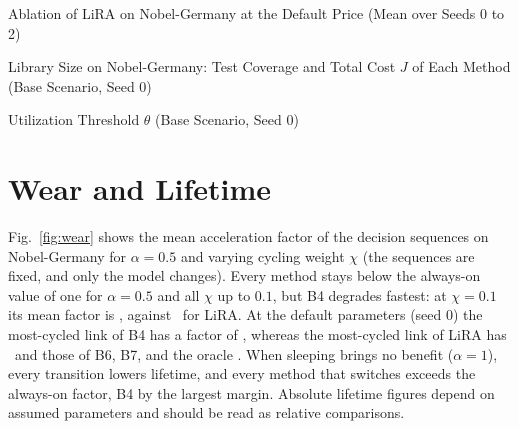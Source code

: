 \documentclass[preprint,12pt]{elsarticle}
\begin{document}
\begin{table}[h!]
\centering
\caption{Ablation of LiRA on Nobel-Germany at the Default Price (Mean over Seeds 0 to 2)}
\label{tab:ablation}
\scriptsize
\setlength{\tabcolsep}{2pt}
\begin{adjustbox}{max width=\linewidth}\end{adjustbox}
\end{table}


\begin{table}[h!]
\centering
\caption{Library Size on Nobel-Germany: Test Coverage and Total Cost $J$ of Each Method (Base Scenario, Seed 0)}
\label{tab:K}
\footnotesize
\setlength{\tabcolsep}{4pt}
\begin{adjustbox}{max width=\linewidth}\end{adjustbox}
\end{table}


\begin{table}[h!]
\centering
\caption{Utilization Threshold $\theta$ (Base Scenario, Seed 0)}
\label{tab:theta}
\footnotesize
\setlength{\tabcolsep}{4pt}
\begin{adjustbox}{max width=\linewidth}\end{adjustbox}
\end{table}


\section{Wear and Lifetime}\label{sec:res-wear}

Fig.~\ref{fig:wear} shows the mean acceleration factor of the decision sequences on Nobel-Germany for $\alpha=0.5$ and varying cycling weight $\chi$ (the sequences are fixed, and only the model changes). Every method stays below the always-on value of one for $\alpha=0.5$ and all $\chi$ up to $0.1$, but B4 degrades fastest: at $\chi=0.1$ its mean factor is \wearBigChiBFour, against \wearBigChiLiRA\ for LiRA. At the default parameters (seed 0) the most-cycled link of B4 has a factor of \maxAFfour, whereas the most-cycled link of LiRA has \maxAFlira\ and those of B6, B7, and the oracle \maxAFothers. When sleeping brings no benefit ($\alpha=1$), every transition lowers lifetime, and every method that switches exceeds the always-on factor, B4 by the largest margin. Absolute lifetime figures depend on assumed parameters and should be read as relative comparisons.
\end{document}
